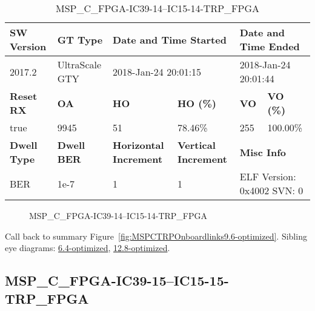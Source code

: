 \begin{table}[h]
\centering
\caption{MSP\_C\_FPGA-IC39-14--IC15-14-TRP\_FPGA}
\label{tab:MSPCFPGAIC3914IC1514TRPFPGA9.6-optimized}
\begin{tabular}{@{}|l|l|l|l|l|l|@{}}
\toprule
\textbf{SW Version}                & \textbf{GT Type}   & \multicolumn{2}{l|}{\textbf{Date and Time Started}}            & \multicolumn{2}{l|}{\textbf{Date and Time Ended}}        \\ \midrule
2017.2                       & UltraScale GTY          & \multicolumn{2}{l|}{2018-Jan-24 20:01:15}                   & \multicolumn{2}{l|}{2018-Jan-24 20:01:44}               \\ \midrule
\textbf{Reset RX}                  & \textbf{OA} & \textbf{HO}   & \textbf{HO (\%)} & \textbf{VO} & \textbf{VO (\%)} \\ \midrule
true & 9945        & 51          & 78.46\%        & 255        & 100.00\%       \\ \midrule
\textbf{Dwell Type}                & \textbf{Dwell BER} & \textbf{Horizontal Increment} & \textbf{Vertical Increment}    & \multicolumn{2}{l|}{\textbf{Misc Info}}                  \\ \midrule
BER                            & 1e-7        & 1        & 1           & \multicolumn{2}{l|}{ELF Version: 0x4002 SVN: 0}                         \\ \bottomrule
\end{tabular}
\end{table}

\begin{figure}[h]
\caption{MSP\_C\_FPGA-IC39-14--IC15-14-TRP\_FPGA} \label{fig:MSPCFPGAIC3914IC1514TRPFPGA9.6-optimized}
\end{figure}

Call back to summary Figure~\ref{fig:MSPCTRPOnboardlinks9.6-optimized}.
Sibling eye diagrams: \hyperref[sec:MSPCFPGAIC3914IC1514TRPFPGA6.4-optimized]{6.4-optimized}, \hyperref[sec:MSPCFPGAIC3914IC1514TRPFPGA12.8-optimized]{12.8-optimized}.

\clearpage
\newpage


\subsection{MSP\_C\_FPGA-IC39-15--IC15-15-TRP\_FPGA}\label{sec:MSPCFPGAIC3915IC1515TRPFPGA9.6-optimized}

